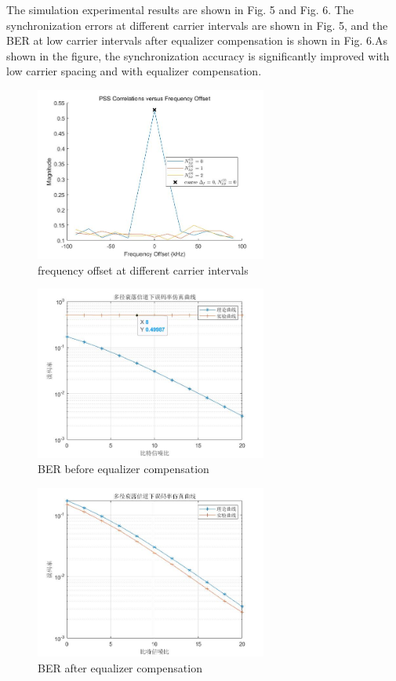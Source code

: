 \documentclass[english]{cccconf}
\begin{document}
{The simulation experimental results are shown in Fig. 5 and Fig. 6. The synchronization errors at different carrier intervals are shown in Fig. 5, and the BER at low carrier intervals after equalizer compensation is shown in Fig. 6.As shown in the figure, the synchronization accuracy is significantly improved with low carrier spacing and with equalizer compensation.
\begin{figure}[htbp]
	\centering
	\setcounter{figure}{6}
	\includegraphics[width=3in]{fig6.png}
	\caption{frequency offset at different carrier intervals}
\end{figure}
\begin{figure}[htbp]
	\centering
	\setcounter{figure}{8}
	\includegraphics[width=3in]{fig8.png}
	\caption{BER before equalizer compensation}
\end{figure}
\begin{figure}[htbp]
	\centering
	\setcounter{figure}{9}
	\includegraphics[width=3in]{fig9.png}
	\caption{BER after equalizer compensation}
\end{figure}
}
\end{document}
